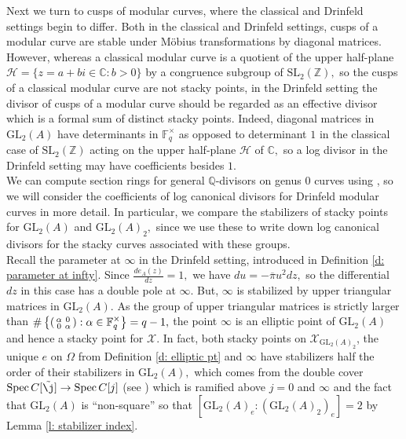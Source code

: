 \documentclass[11pt]{amsart}
\theoremstyle{definition}
\newenvironment{psmallmatrix}
{\left(\begin{smallmatrix}}
	{\end{smallmatrix}\right)}
\numberwithin{equation}{section}
\newcommand{\GL}{\mathrm{GL}} 	%
\newcommand{\SL}{\mathrm{SL}} 	%
\newcommand{\Spec}{\operatorname{Spec}} 	%
\newcommand{\cH}{\mathcal{H}}		%
\newcommand{\sX}{\mathscr{X}}		%
\newcommand{\bbC}{\mathbb{C}}		%
\newcommand{\bbF}{\mathbb{F}}		%
\newcommand{\bbQ}{\mathbb{Q}}		%
\newcommand{\bbZ}{\mathbb{Z}}		%
\begin{document}
Next we turn to cusps of modular curves, where the classical and Drinfeld settings begin to differ. 
Both in the classical and Drinfeld settings, cusps of a modular curve are stable under M\"obius transformations by diagonal matrices. However, whereas a classical modular curve is a quotient of the upper half-plane $\cH=\{z=a+bi\in \bbC: b>0\}$ by a congruence subgroup of $\SL_2(\bbZ),$ 
so the cusps of a classical modular curve are not stacky points, in the Drinfeld setting the divisor of cusps of a modular curve should be regarded as an effective divisor which is a formal sum of distinct stacky points. Indeed, diagonal matrices in $\GL_2(A)$ have determinants in $\bbF_q^{\times}$ as opposed to determinant $1$ in the classical case of $\SL_2(\bbZ)$ acting on the upper half-plane $\cH$ of $\bbC,$ so a log divisor in the Drinfeld setting may have coefficients besides $1.$\\

We can compute section rings for general $\bbQ$-divisors on genus $0$ curves using \cite{ODorney-canonical-rings-Q-divisors-on-P1}, so 
we will consider the coefficients of log canonical divisors for Drinfeld modular curves in more detail. In particular, we compare the stabilizers of stacky points for $\GL_2(A)$ and $\GL_2(A)_2,$ since we use these to write down log canonical divisors for the stacky curves associated with these groups.\\ 

Recall the parameter at $\infty$ in the Drinfeld setting, introduced in Definition \ref{d: parameter at infty}. Since $\displaystyle{\frac{de_A(z)}{dz}=1},$ we have 
$du = -\overline{\pi}u^2 dz,$ so the differential $dz$ in this case has a double pole at $\infty.$ But, $\infty$ is stabilized by upper triangular matrices in $\GL_2(A).$ As the group of upper triangular matrices is strictly larger than $\displaystyle{\#\left\{\begin{psmallmatrix}\alpha&0\\0&\alpha\end{psmallmatrix}:\alpha\in \bbF_q^{\times} \right\}}=q-1,$ the point $\infty$ is an elliptic point of $\GL_2(A)$ and hence a stacky point for $\sX.$ In fact, both stacky points on $\sX_{\GL_2(A)_2}$, the unique $e$ on $\Omega$ from Definition \ref{d: elliptic pt} and $\infty$ have stabilizers half the order of their stabilizers in $\GL_2(A),$ which comes from the double cover $\Spec C[\tilde{\j}]\to \Spec C[j]$ (see \cite[Page $7$]{Breuer-Gekeler-h-function}) which is ramified above $j=0$ and $\infty$ and the fact that $\GL_2(A)$ is ``non-square'' so that $[\GL_2(A)_e:(\GL_2(A)_2)_e]=2$ by Lemma \ref{l: stabilizer index}.\\
\end{document}
